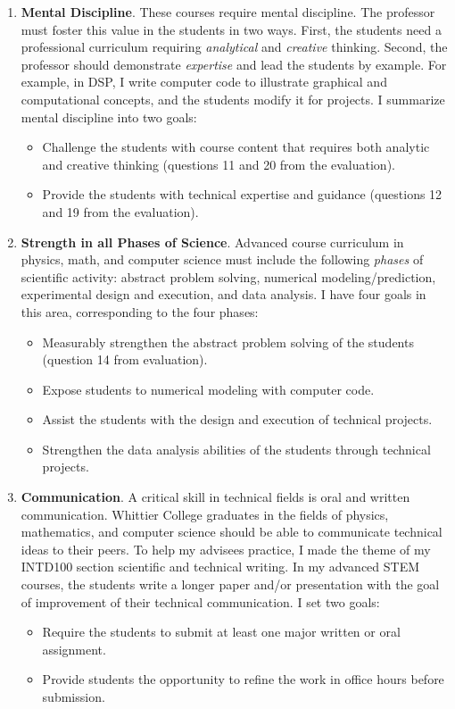\documentclass[../../../main.tex]{subfiles}
\begin{document}
\begin{enumerate}
\item \textbf{Mental Discipline}.  These courses require mental discipline.  The professor must foster this value in the students in two ways.  First, the students need a professional curriculum requiring \textit{analytical} and \textit{creative} thinking.  Second, the professor should demonstrate \textit{expertise} and lead the students by example.  For example, in DSP, I write computer code to illustrate graphical and computational concepts, and the students modify it for projects.  I summarize mental discipline into two goals:

\begin{itemize}
\item Challenge the students with course content that requires both analytic and creative thinking (questions 11 and 20 from the evaluation).
\item Provide the students with technical expertise and guidance (questions 12 and 19 from the evaluation).
\end{itemize}

\item \textbf{Strength in all Phases of Science}. Advanced course curriculum in physics, math, and computer science must include the following \textit{phases} of scientific activity: abstract problem solving, numerical modeling/prediction, experimental design and execution, and data analysis. I have four goals in this area, corresponding to the four phases:

\begin{itemize}
\item Measurably strengthen the abstract problem solving of the students (question 14 from evaluation).
\item Expose students to numerical modeling with computer code.
\item Assist the students with the design and execution of technical projects.
\item Strengthen the data analysis abilities of the students through technical projects.
\end{itemize}

\item \textbf{Communication}.  A critical skill in technical fields is oral and written communication.  Whittier College graduates in the fields of physics, mathematics, and computer science should be able to communicate technical ideas to their peers.  To help my advisees practice, I made the theme of my INTD100 section scientific and technical writing.  In my advanced STEM courses, the students write a longer paper and/or presentation with the goal of improvement of their technical communication.  I set two goals:

\begin{itemize}
\item Require the students to submit at least one major written or oral assignment.
\item Provide students the opportunity to refine the work in office hours before submission.
\end{itemize}
\end{enumerate}
\end{document}
